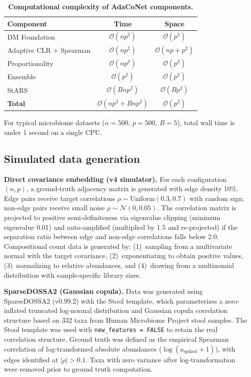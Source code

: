 \documentclass[fleqn]{nature}
\newcommand{\calO}{\mathcal{O}}
\begin{document}
\begin{methods}
\begin{table}[htbp]
\caption{\textbf{Computational complexity of AdaCoNet components.}}
\label{tab:complexity}
\centering
\begin{tabular}{lcc}
\toprule
Component & Time & Space \\
\midrule
DM Foundation                & $\calO(np^2)$ & $\calO(p^2)$ \\
Adaptive CLR + Spearman      & $\calO(np^2)$ & $\calO(np + p^2)$ \\
Proportionality              & $\calO(np^2)$ & $\calO(p^2)$ \\
Ensemble                     & $\calO(p^2)$  & $\calO(p^2)$ \\
StARS                        & $\calO(Bnp^2)$ & $\calO(Bp^2)$ \\
\midrule
\textbf{Total}               & $\calO(np^2 + Bnp^2)$ & $\calO(p^2)$ \\
\bottomrule
\end{tabular}
\end{table}

For typical microbiome datasets ($n = 500$, $p = 500$, $B = 5$), total wall time is under 1 second on a single CPU.


\subsection*{Simulated data generation}

\textbf{Direct covariance embedding (v4 simulator).}
For each configuration $(n, p)$, a ground-truth adjacency matrix is generated with edge density 10\%.
Edge pairs receive target correlations $\rho \sim \mathrm{Uniform}(0.3, 0.7)$ with random sign; non-edge pairs receive small noise $\rho \sim \mathcal{N}(0, 0.05)$.
The correlation matrix is projected to positive semi-definiteness via eigenvalue clipping (minimum eigenvalue 0.01) and auto-amplified (multiplied by 1.5 and re-projected) if the separation ratio between edge and non-edge correlations falls below 2.0.
Compositional count data is generated by: (1)~sampling from a multivariate normal with the target covariance, (2)~exponentiating to obtain positive values, (3)~normalizing to relative abundances, and (4)~drawing from a multinomial distribution with sample-specific library sizes.

\textbf{SparseDOSSA2 (Gaussian copula).}
Data was generated using SparseDOSSA2 (v0.99.2)\cite{sparsedossa2} with the Stool template, which parameterizes a zero-inflated truncated log-normal distribution and Gaussian copula correlation structure based on 332 taxa from Human Microbiome Project stool samples\cite{lloydprice2017}.
The Stool template was used with \texttt{new\_features = FALSE} to retain the real correlation structure.
Ground truth was defined as the empirical Spearman correlation of log-transformed absolute abundances ($\log(a_{\text{spiked}} + 1)$), with edges identified at $|\rho| > 0.1$.
Taxa with zero variance after log-transformation were removed prior to ground truth computation.



\end{methods}
\end{document}
